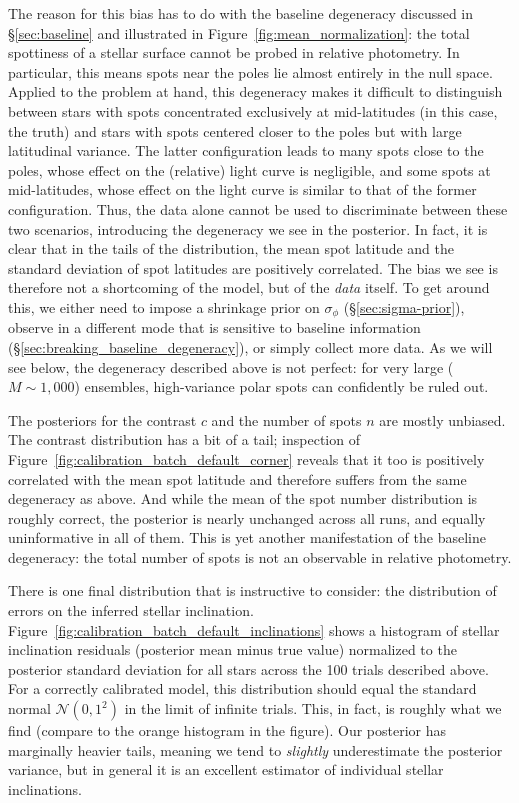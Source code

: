 \documentclass[modern]{aastex62}
\begin{document}
The reason for this bias has to do with the baseline degeneracy discussed in
\S\ref{sec:baseline} and illustrated in Figure~\ref{fig:mean_normalization}:
the total spottiness of a stellar surface cannot be probed in relative
photometry. In particular, this means spots near the poles lie almost
entirely in the null space. Applied to the problem at hand, this degeneracy
makes it difficult to distinguish between stars with spots concentrated
exclusively at mid-latitudes (in this case, the truth) and
stars with spots centered closer to the poles but with large latitudinal
variance. The latter configuration leads to many spots close to the poles,
whose effect on the (relative) light curve is negligible, and some spots
at mid-latitudes, whose effect on the light curve is similar to that of
the former configuration.
Thus, the data alone cannot be used to discriminate between these two
scenarios, introducing the degeneracy we see in the posterior. In fact,
it is clear that in the tails of the distribution, the mean spot latitude
and the standard deviation of spot latitudes are positively correlated.
The bias we see is therefore not a shortcoming of the model, but of the
\emph{data} itself. To get around this, we either need to impose a
shrinkage prior on $\sigma_\phi$ (\S\ref{sec:sigma-prior}),
observe in a different mode that is sensitive to baseline information
(\S\ref{sec:breaking_baseline_degeneracy}), or simply collect more data.
As we will see below, the degeneracy described above is not perfect:
for very large ($M \sim 1{,}000$) ensembles, high-variance polar spots
can confidently be ruled out.

The posteriors for the contrast $c$ and the number of spots $n$
are mostly unbiased. The contrast distribution has a bit of
a tail; inspection of Figure~\ref{fig:calibration_batch_default_corner}
reveals that it too is positively correlated with the mean spot latitude
and therefore suffers from the same degeneracy as above. And while the
mean of the spot number distribution is roughly correct, the posterior
is nearly unchanged across all runs, and equally uninformative in all
of them. This is yet another manifestation of the baseline degeneracy:
the total number of spots is not an observable in relative photometry.

There is one final distribution that is instructive to consider: the
distribution of errors on the inferred stellar inclination.
Figure~\ref{fig:calibration_batch_default_inclinations} shows a histogram
of stellar inclination residuals (posterior mean minus true value)
normalized to the posterior standard deviation for all stars across the
100 trials described above. For a correctly calibrated model, this distribution
should equal the standard normal $\mathcal{N}(0, 1^2)$ in the limit of
infinite trials. This, in fact, is roughly what we find (compare to the
orange histogram in the figure). Our posterior has marginally
heavier tails, meaning we tend to \emph{slightly} underestimate the
posterior variance, but in general it is an excellent estimator of
individual stellar inclinations.
\end{document}
